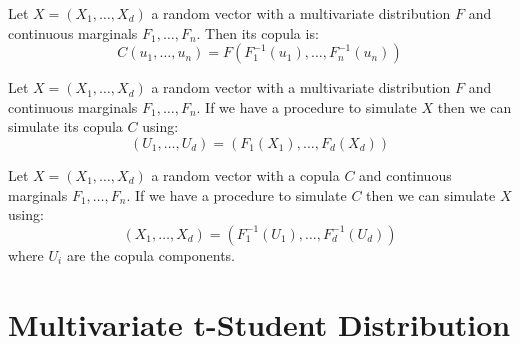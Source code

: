 \documentclass[11pt,fleqn]{book} %
\begin{document}
\begin{corollary}
	\label{cor:cop1}
	Let $X=(X_1, \dots, X_d)$ a random vector with a multivariate 
	distribution $F$ and continuous marginals $F_1, \dots, F_n$. 
	Then its copula is:
	\begin{displaymath}
		C(u_1,\dots,u_n) = F(F_1^{-1}(u_1), \dots, F_n^{-1}(u_n))
	\end{displaymath}
\end{corollary}

\begin{corollary}
	\label{cor:cop2}
	Let $X=(X_1, \dots, X_d)$ a random vector with a multivariate 
	distribution $F$ and continuous marginals $F_1, \dots, F_n$.
	If we have a procedure to simulate $X$ then we can simulate 
	its copula $C$ using:
	\begin{displaymath}
		(U_1, \dots, U_d) = (F_1(X_1), \dots, F_d(X_d))
	\end{displaymath}
\end{corollary}

\begin{corollary}
	\label{cor:cop3}
	Let $X=(X_1, \dots, X_d)$ a random vector with a copula $C$
	and continuous marginals $F_1, \dots, F_n$. If we have a
	procedure to simulate $C$ then we can simulate $X$ using:
	\begin{displaymath}
		(X_1, \dots, X_d) = (F_1^{-1}(U_1), \dots, F_d^{-1}(U_d))
	\end{displaymath}
	where $U_i$ are the copula components.
\end{corollary}


\section{Multivariate t-Student Distribution}
\label{ap:mtsd}
\end{document}
